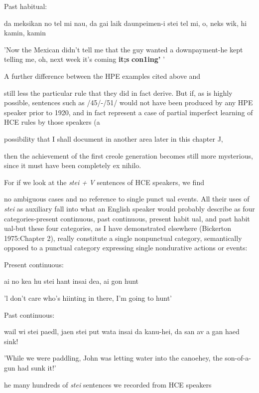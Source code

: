 \ea\label{ex:55}

\glt
\z

Past habitual:

da meksikan no tel mi nau, da gai laik daunpeimen{}-i stei tel mi, o, neks wik, hi kamin, kamin

'Now the Mexican didn't tell me that the guy wanted a down\-payment-he kept telling me, oh, next week it's coming \textbf{it;s} \textbf{con1ing' }'

A further difference between the HPE examples cited above and

still less the particular rule that they did in fact derive. But if, as is highly possible, sentences such as /45/-/51/ would not have been produced by any HPE speaker prior to 1920, and in fact represent a case of partial imperfect learning of HCE rules by those speakers (a

possibility that I shall document in another area later in this chapter J,

then the achievement of the first creole generation becomes still more mysterious, since it must have been completely ex nihilo.

For if we look at the \textit{stei} \textit{+} \textit{V} sentences of HCE speakers, we find

no ambiguous cases and no reference to single punct ual events. All their uses of \textit{stei} as auxiliary fall into what an English speaker would probably describe as four categories-present continuous, past con\-tinuous, present habit ual, and past habit ual-but these four categories, as I have demonstrated elsewhere (Bickerton 1975:Chapter 2), really constitute a single nonpunctual category, semantically opposed to a punctual category expressing single nondurative actions or events:

\ea\label{ex:52}
 Present continuous:
\glt
\z

ai no kea hu stei hant insai dea, ai gon hunt

'l don't care who's hiinting in there, I'm going to hunt'

\ea\label{ex:53}
 Past continuous:
\glt
\z

wail wi stei paedl, jaen stei put wata insai da kanu-hei, da san av a gan haed sink!

'While we were paddling, John was letting water into the canoe\-hey, the son-of-a-gun had sunk it!'

he many hundreds of \textit{stei} sentences we recorded from HCE speakers


